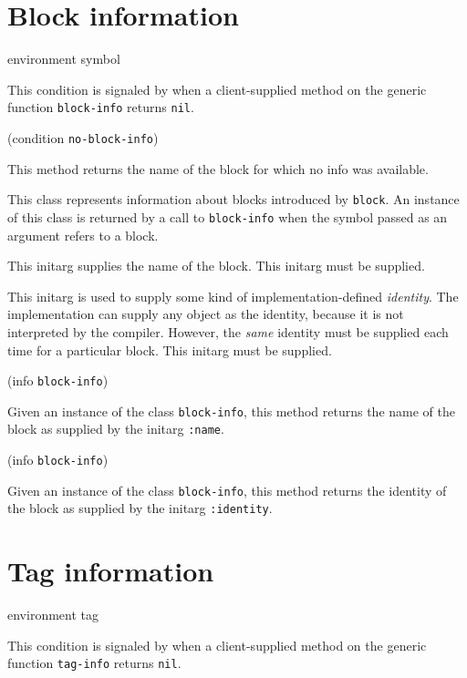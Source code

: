 \section{Block information}

 {environment symbol}


This condition is signaled by \sysname{} when a client-supplied method
on the generic function \texttt{block-info} returns \texttt{nil}.

 {(condition {\tt no-block-info})}

This method returns the name of the block for which no info was
available. 


This class represents information about blocks introduced by
\texttt{block}.  An instance of this class is returned by a call to
\texttt{block-info} when the symbol passed as an argument refers to a
block.


This initarg supplies the name of the block.  This initarg must be
supplied.


This initarg is used to supply some kind of implementation-defined 
\emph{identity}.  The implementation can supply any object as the
identity, because it is not interpreted by the compiler.  However, the
\emph{same} identity must be supplied each time for a particular
block.  This initarg must be supplied. 

 {(info {\tt block-info})}

Given an instance of the class \texttt{block-info}, this method
returns the name of the block as supplied by the initarg
\texttt{:name}.

 {(info {\tt block-info})}

Given an instance of the class \texttt{block-info}, this method
returns the identity of the block as supplied by the initarg
\texttt{:identity}.

\section{Tag information}

 {environment tag}


This condition is signaled by \sysname{} when a client-supplied method
on the generic function \texttt{tag-info} returns \texttt{nil}.

